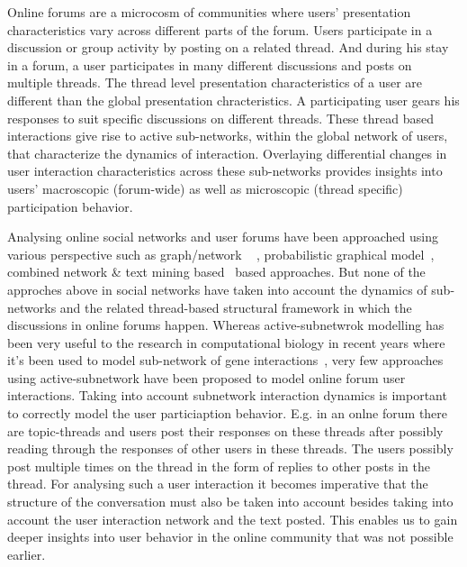 Online forums are a microcosm of communities where users' presentation
characteristics vary across different parts of the forum. Users participate in a
discussion or group activity by posting on a related thread. And during his
stay in a forum, a user participates in many different discussions and posts on multiple
threads. The thread level presentation characteristics of a user are different
than the global presentation chracteristics. A participating user gears his
responses to suit specific discussions on different threads. These thread based
interactions give rise to active sub-networks, within the global network of users,
that characterize the dynamics of interaction. Overlaying differential changes
in user interaction characteristics across these sub-networks provides
insights into users' macroscopic (forum-wide) as well as microscopic (thread
specific) participation behavior. 

Analysing online social networks and user forums have been approached using
various perspective such as graph/network ~\cite{Shi:2000:NCI:351581.351611,
Shi00learningsegmentation} , probabilistic 
graphical model~\cite{ Airoldi:2008:MMS:1390681.1442798}, 
combined network \& text mining
based~\cite{Ho:2012:DHT:2187836.2187936,Nallapati:2008:JLT:1401890.1401957}
based approaches. But none of the approches above in social networks have taken
into account the dynamics of sub-networks and the related thread-based structural framework in
which the discussions in online forums happen. Whereas active-subnetwrok modelling has
been very useful to the research in computational biology in recent years where
it's been used to model sub-network of gene
interactions~\cite{journals/ploscb/DeshpandeSVHM10,Lichtenstein:Charleston},
very few approaches using active-subnetwork have been proposed to model online
forum user interactions. Taking into account subnetwork interaction
dynamics is important to correctly model the user particiaption behavior. E.g.
in an onlne forum there are topic-threads and users post their responses on
these threads after possibly reading through the responses of other users in
these threads. The users possibly post multiple times on the thread in the form
of replies to other posts in the thread. For analysing such a user interaction it
becomes imperative that the structure of the conversation must also be taken
into account  besides taking into account the user interaction network and the
text posted. This enables us to gain deeper insights into user behavior in the
online community that was not possible earlier. 

